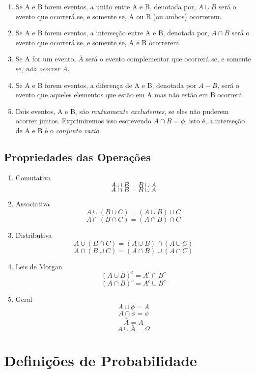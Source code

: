 \begin{enumerate}
    \item Se A e B forem eventos, a união entre A e B, denotada por, $A \cup B$ será o evento que
    ocorrerá se, e somente se, A ou B (ou ambos) ocorrerem.
    \item Se A e B forem eventos, a interseção entre A e B, denotada por, $A \cap B$ será o evento que
    ocorrerá se, e somente se, A e B ocorrerem.
    \item Se A for um evento, $\bar{A}$ será o evento complementar que ocorrerá
    se, e somente se, \emph{não ocorrer A}.
    \item Se A e B forem eventos, a diferença de A e B, denotada
    por $A-B$, será o evento que aqueles elementos que estão em A mas
    não estão em B ocorrerá.
    \item Dois eventos, A e B, são \emph{mutuamente excludentes}, se eles
    não puderem ocorrer juntos. Exprimiremos isso escrevendo $A \cap B =
    \phi$, isto é, a interseção de A e B é o \emph{conjunto vazio}.
\end{enumerate}



\subsection{Propriedades das Operações}

\begin{enumerate}
    \item Comutativa
$$A \cup B = B \cup A$$
$$A \cap B = B \cup A$$
    \item Associativa
$$A \cup (B \cup C) = (A \cup B)\cup C$$
$$A \cap (B \cap C) = (A \cap B)\cap C$$
    \item Distributiva
$$A \cup (B \cap C) = (A \cup B)\cap (A \cup C)$$
$$A \cap (B \cup C) = (A \cap B)\cup (A \cap C)$$
    \item Leis de Morgan
$$ (A \cup B)^{c}= A^{c} \cap B^{c}$$
$$ (A \cap B)^{c}= A^{c} \cup B^{c}$$
\item Geral
$$ A \cup \phi = A$$
$$ A \cap \phi = \phi$$
$$ \bar{\bar{A}}=A $$
$$ A \cup \bar{A}= \Omega $$
\end{enumerate}












\newpage 
\section{Definições de Probabilidade}


